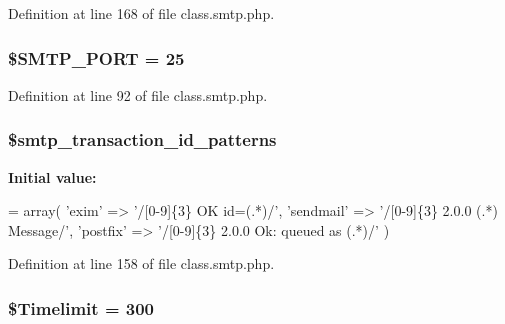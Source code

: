 Definition at line 168 of file class.\+smtp.\+php.

\subsubsection[{\texorpdfstring{\$\+S\+M\+T\+P\+\_\+\+P\+O\+RT}{$SMTP_PORT}}]{\setlength{\rightskip}{0pt plus 5cm}\$S\+M\+T\+P\+\_\+\+P\+O\+RT = 25}\hypertarget{class_s_m_t_p_ae1e172b1b60aa3a8f2385012966200da}{}\label{class_s_m_t_p_ae1e172b1b60aa3a8f2385012966200da}


Definition at line 92 of file class.\+smtp.\+php.

\subsubsection[{\texorpdfstring{\$smtp\+\_\+transaction\+\_\+id\+\_\+patterns}{$smtp_transaction_id_patterns}}]{\setlength{\rightskip}{0pt plus 5cm}\$smtp\+\_\+transaction\+\_\+id\+\_\+patterns\hspace{0.3cm}{\ttfamily [protected]}}\hypertarget{class_s_m_t_p_a8a963ff3fd663a9a55ee15aa4386f09a}{}\label{class_s_m_t_p_a8a963ff3fd663a9a55ee15aa4386f09a}
{\bfseries Initial value\+:}
\begin{DoxyCode}
= array(
        \textcolor{stringliteral}{'exim'} => \textcolor{stringliteral}{'/[0-9]\{3\} OK id=(.*)/'},
        \textcolor{stringliteral}{'sendmail'} => \textcolor{stringliteral}{'/[0-9]\{3\} 2.0.0 (.*) Message/'},
        \textcolor{stringliteral}{'postfix'} => \textcolor{stringliteral}{'/[0-9]\{3\} 2.0.0 Ok: queued as (.*)/'}
    )
\end{DoxyCode}


Definition at line 158 of file class.\+smtp.\+php.

\subsubsection[{\texorpdfstring{\$\+Timelimit}{$Timelimit}}]{\setlength{\rightskip}{0pt plus 5cm}\$Timelimit = 300}\hypertarget{class_s_m_t_p_a06202429705cff540be47481b453fef6}{}\label{class_s_m_t_p_a06202429705cff540be47481b453fef6}


